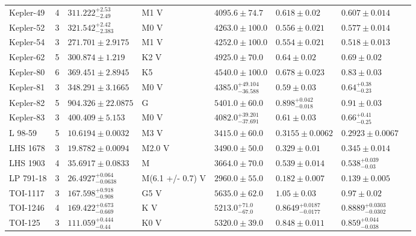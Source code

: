 \begin{tabular}{lrllllll}
Kepler-49 & 4 & $311.222^{+2.53}_{-2.49}$ & M1 V & $4095.6 \pm 74.7$ & $0.618 \pm 0.02$ & $0.607 \pm 0.014$ & \cite{LELEU_ET_AL__2023} \\
Kepler-52 & 3 & $321.542^{+2.42}_{-2.383}$ & M0 V & $4263.0 \pm 100.0$ & $0.556 \pm 0.021$ & $0.577 \pm 0.014$ & \cite{ROWE_ET_AL__2014} \\
Kepler-54 & 3 & $271.701 \pm 2.9175$ & M1 V & $4252.0 \pm 100.0$ & $0.554 \pm 0.021$ & $0.518 \pm 0.013$ & \cite{ROWE_ET_AL__2014} \\
Kepler-62 & 5 & $300.874 \pm 1.219$ & K2 V & $4925.0 \pm 70.0$ & $0.64 \pm 0.02$ & $0.69 \pm 0.02$ & \cite{BORUCKI_ET_AL__2013} \\
Kepler-80 & 6 & $369.451 \pm 2.8945$ & K5 & $4540.0 \pm 100.0$ & $0.678 \pm 0.023$ & $0.83 \pm 0.03$ & \cite{SHALLUE__AMP__VANDERBURG_2018} \\
Kepler-81 & 3 & $348.291 \pm 3.1665$ & M0 V & $4385.0^{+49.104}_{-36.588}$ & $0.59 \pm 0.03$ & $0.64^{+0.38}_{-0.23}$ & \cite{MORTON_ET_AL__2016} \\
Kepler-82 & 5 & $904.326 \pm 22.0875$ & G & $5401.0 \pm 60.0$ & $0.898^{+0.042}_{-0.018}$ & $0.91 \pm 0.03$ & \cite{FULTON__AMP__PETIGURA_2018} \\
Kepler-83 & 3 & $400.409 \pm 5.153$ & M0 V & $4082.0^{+39.201}_{-37.691}$ & $0.61 \pm 0.03$ & $0.66^{+0.41}_{-0.25}$ & \cite{MORTON_ET_AL__2016} \\
L 98-59 & 5 & $10.6194 \pm 0.0032$ & M3 V & $3415.0 \pm 60.0$ & $0.3155 \pm 0.0062$ & $0.2923 \pm 0.0067$ & \cite{CADIEUX_ET_AL_2025} \\
LHS 1678 & 3 & $19.8782 \pm 0.0094$ & M2.0 V & $3490.0 \pm 50.0$ & $0.329 \pm 0.01$ & $0.345 \pm 0.014$ & \cite{SILVERSTEIN_ET_AL__2022} \\
LHS 1903 & 4 & $35.6917 \pm 0.0833$ & M & $3664.0 \pm 70.0$ & $0.539 \pm 0.014$ & $0.538^{+0.039}_{-0.03}$ & \cite{WILSON_ET_AL_2026} \\
LP 791-18 & 3 & $26.4927^{+0.064}_{-0.0638}$ & M(6.1 +/- 0.7) V & $2960.0 \pm 55.0$ & $0.182 \pm 0.007$ & $0.139 \pm 0.005$ & \cite{PETERSON_ET_AL_2023} \\
TOI-1117 & 3 & $167.598^{+0.918}_{-0.908}$ & G5 V & $5635.0 \pm 62.0$ & $1.05 \pm 0.03$ & $0.97 \pm 0.02$ & \cite{LOCKLEY_ET_AL_2025} \\
TOI-1246 & 4 & $169.422^{+0.673}_{-0.669}$ & K V & $5213.0^{+71.0}_{-67.0}$ & $0.8649^{+0.0187}_{-0.0177}$ & $0.8889^{+0.0303}_{-0.0302}$ & \cite{MACDOUGALL_ET_AL__2023} \\
TOI-125 & 3 & $111.059^{+0.444}_{-0.44}$ & K0 V & $5320.0 \pm 39.0$ & $0.848 \pm 0.011$ & $0.859^{+0.044}_{-0.038}$ & \cite{NIELSEN_ET_AL__2020} \\

\end{tabular}
